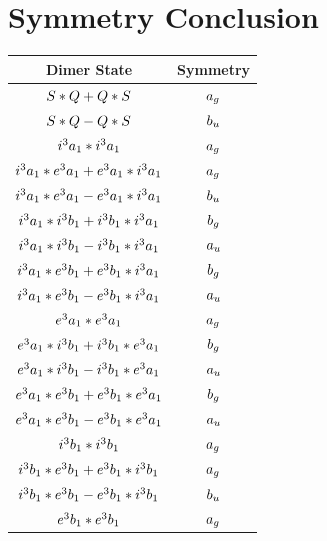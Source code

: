 \documentclass{article}
\begin{document}
\vspace{0.5cm}

\newpage
\newpage

\section{Symmetry Conclusion} 
\begin{table}[ht]
\centering
\begin{tabular}{cc}
\hline
Dimer State & Symmetry \\ [0.1cm] 
\hline
$S * Q + Q * S \displaystyle $ & $a_{g} \displaystyle $ \\ [0.1cm] 
$S * Q - Q * S \displaystyle $ & $b_u \displaystyle $ \\ [0.1cm] 
$i^3 a_1 * i^3 a_1 \displaystyle $ & $a_{g} \displaystyle $ \\ [0.1cm] 
$i^3 a_1 * e^3 a_1 + e^3 a_1 * i^3 a_1 \displaystyle $ & $a_{g} \displaystyle $ \\ [0.1cm] 
$i^3 a_1 * e^3 a_1 - e^3 a_1 * i^3 a_1 \displaystyle $ & $b_u \displaystyle $ \\ [0.1cm] 
$i^3 a_1 * i^3 b_{1} + i^3 b_{1} * i^3 a_1 \displaystyle $ & $b_g \displaystyle $ \\ [0.1cm] 
$i^3 a_1 * i^3 b_{1} - i^3 b_{1} * i^3 a_1 \displaystyle $ & $a_{u} \displaystyle $ \\ [0.1cm] 
$i^3 a_1 * e^3 b_{1} + e^3 b_{1} * i^3 a_1 \displaystyle $ & $b_g \displaystyle $ \\ [0.1cm] 
$i^3 a_1 * e^3 b_{1} - e^3 b_{1} * i^3 a_1 \displaystyle $ & $a_{u} \displaystyle $ \\ [0.1cm] 
$e^3 a_1 * e^3 a_1 \displaystyle $ & $a_{g} \displaystyle $ \\ [0.1cm] 
$e^3 a_1 * i^3 b_{1} + i^3 b_{1} * e^3 a_1 \displaystyle $ & $b_g \displaystyle $ \\ [0.1cm] 
$e^3 a_1 * i^3 b_{1} - i^3 b_{1} * e^3 a_1 \displaystyle $ & $a_{u} \displaystyle $ \\ [0.1cm] 
$e^3 a_1 * e^3 b_{1} + e^3 b_{1} * e^3 a_1 \displaystyle $ & $b_g \displaystyle $ \\ [0.1cm] 
$e^3 a_1 * e^3 b_{1} - e^3 b_{1} * e^3 a_1 \displaystyle $ & $a_{u} \displaystyle $ \\ [0.1cm] 
$i^3 b_{1} * i^3 b_{1} \displaystyle $ & $a_{g} \displaystyle $ \\ [0.1cm] 
$i^3 b_{1} * e^3 b_{1} + e^3 b_{1} * i^3 b_{1} \displaystyle $ & $a_{g} \displaystyle $ \\ [0.1cm] 
$i^3 b_{1} * e^3 b_{1} - e^3 b_{1} * i^3 b_{1} \displaystyle $ & $b_u \displaystyle $ \\ [0.1cm] 
$e^3 b_{1} * e^3 b_{1} \displaystyle $ & $a_{g} \displaystyle $ \\ [0.1cm] 
\hline
\end{tabular}
\end{table}
\end{document}
